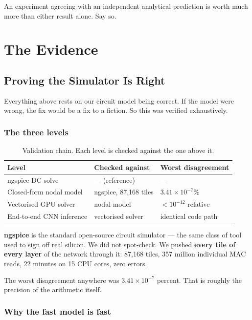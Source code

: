\documentclass[11pt,a4paper]{report}
\newcommand{\jargon}[1]{\textcolor{acc}{\textbf{#1}}}
\begin{document}
An experiment agreeing with an independent analytical prediction is worth much
more than either result alone. Say so.

\part{The Evidence}
\chapter{Proving the Simulator Is Right}

Everything above rests on our circuit model being correct. If the model were
wrong, the fix would be a fix to a fiction. So this was verified exhaustively.

\section{The three levels}

\begin{table}[h]
\centering
\caption{Validation chain. Each level is checked against the one above it.}
\begin{tabular}{lll}
\toprule
Level & Checked against & Worst disagreement \\
\midrule
ngspice DC solve & --- (reference) & --- \\
Closed-form nodal model & ngspice, 87{,}168 tiles & $3.41\times10^{-7}$\% \\
Vectorised GPU solver & nodal model & $<10^{-12}$ relative \\
End-to-end CNN inference & vectorised solver & identical code path \\
\bottomrule
\end{tabular}
\end{table}

\jargon{ngspice} is the standard open-source circuit simulator --- the same
class of tool used to sign off real silicon. We did not spot-check. We pushed
\textbf{every tile of every layer} of the network through it: 87{,}168 tiles,
357 million individual MAC reads, 22 minutes on 15 CPU cores, zero errors.

The worst disagreement anywhere was $3.41\times10^{-7}$ percent. That is
roughly the precision of the arithmetic itself.

\section{Why the fast model is fast}
\end{document}
